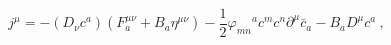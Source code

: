 \begin{equation}
j^{\mu} = -(D_{\nu}c^{a})(F_{a}^{\mu \nu} + B_{a}\eta^{\mu \nu}) - \frac{1}{2} {\varphi_{m n}}^{a} 
c^{m}c^{n}\partial^{\mu}{\bar{c}}_{a} - B_{a} D^{\mu} c^{a}~,
\end{equation}

